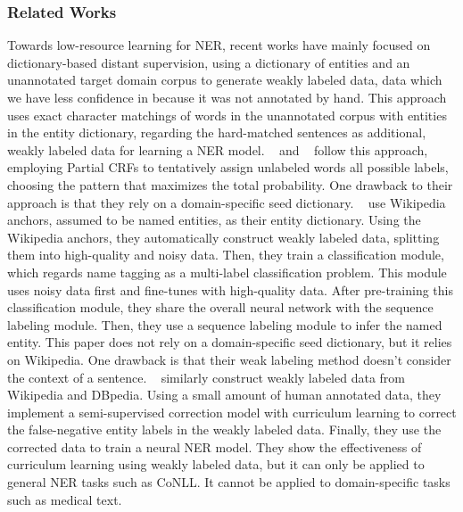 \subsubsection{Related Works}
Towards low-resource learning for NER,
recent works have mainly focused on dictionary-based distant supervision, using a dictionary of entities and an unannotated target domain corpus to generate weakly labeled data, data which we have less confidence in because it was not annotated by hand. This approach uses exact character matchings of words in the unannotated corpus with entities in the entity dictionary, regarding the hard-matched sentences as additional, weakly labeled data for learning a NER model. 
~\cite{autoner} and ~\cite{yangner} follow this approach, employing Partial CRFs to tentatively assign unlabeled words all possible labels, choosing the pattern that maximizes the total probability. One drawback to their approach is that they rely on a domain-specific seed dictionary. 
~\cite{weakcrf} use Wikipedia anchors, assumed to be named entities, as their entity dictionary. Using the Wikipedia anchors, they automatically construct weakly labeled data, splitting them into high-quality and noisy data. Then, they train a classification module, which regards name tagging as a multi-label classification problem. This module uses noisy data first and fine-tunes with high-quality data. After pre-training this classification module, they share the overall neural network with the sequence labeling module. Then, they use a sequence labeling module to infer the named entity. This paper does not rely on a domain-specific seed dictionary, but it relies on Wikipedia. One drawback is that their weak labeling method doesn't consider the context of a sentence.
~\cite{opencorrection} similarly construct weakly labeled data from Wikipedia and DBpedia. Using a small amount of human annotated data, they implement a semi-supervised correction model with curriculum learning to correct the false-negative entity labels in the weakly labeled data. Finally, they use the corrected data to train a neural NER model. They show the effectiveness of curriculum learning using weakly labeled data, but it can only be applied to general NER tasks such as CoNLL. It cannot be applied to domain-specific tasks such as medical text.


